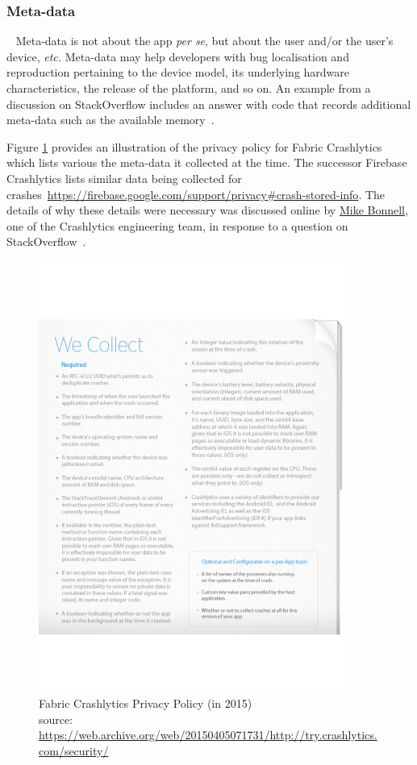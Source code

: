 \subsubsection{Meta-data}~\label{section-meta-data}
Meta-data is not about the app \emph{per se}, but about the user and/or the user's device, \emph{etc.} 
Meta-data may help developers with bug localisation and reproduction pertaining to the device model, its underlying hardware characteristics, the release of the platform, and so on. An example from a discussion on StackOverflow includes an answer with code that records additional meta-data such as the available memory~.

Figure \ref{fig:fabric-crashlytics-privacy-policy} provides an illustration of the privacy policy for Fabric Crashlytics which lists various the meta-data it collected at the time. The successor Firebase Crashlytics lists similar data being collected for crashes~\url{https://firebase.google.com/support/privacy#crash-stored-info}. The details of why these details were necessary was discussed online by \href{https://stackoverflow.com/users/3975963/mike-bonnell}{Mike Bonnell}, 
one of the Crashlytics engineering team, in response to a question on StackOverflow~.

\begin{figure}
    \centering
    \includegraphics[width=10cm]{images/fabric-crashlytics/crashlytics-privacy-policy-38154ffbd69ef44a478b54365dc9b3ad.pdf}
    \caption[Fabric Crashlytics Privacy Policy (in 2015)]{Fabric Crashlytics Privacy Policy (in 2015)\\{source: \tiny \url{https://web.archive.org/web/20150405071731/http://try.crashlytics.com/security/}}}
    \label{fig:fabric-crashlytics-privacy-policy}
\end{figure}

